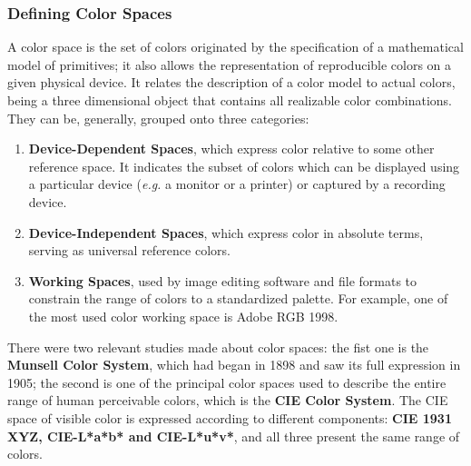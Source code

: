\subsubsection{Defining Color Spaces}			%
%
A color space is the set of colors originated by the specification of a mathematical model of primitives; it also
allows the representation of reproducible colors on a given physical device. It relates the description
of a color model to actual colors, being a three dimensional object that contains all realizable color
combinations. They can be, generally, grouped onto three categories:
%
\begin{enumerate}
	\item \textbf{Device-Dependent Spaces}, which express color relative to some other reference space. It
	  indicates the subset of colors which can be displayed using a particular device (\emph{e.g.} a monitor or a
	  printer) or captured by a recording device.
	\item \textbf{Device-Independent Spaces}, which express color in absolute terms, serving as universal
	  reference colors.
	\item \textbf{Working Spaces}, used by image editing software and file formats to constrain the range of
  	colors to a standardized palette. For example, one of the most used color working space is Adobe RGB 1998.
\end{enumerate} \par
%
There were two relevant studies made about color spaces: the fist one is the \textbf{Munsell Color System},
which had began in 1898 and saw its full expression in 1905; the second is one of the principal color spaces used to describe the
entire range of human perceivable colors, which is the \textbf{CIE Color System}. The CIE space of visible color is expressed
according to different components: \textbf{CIE 1931 XYZ, CIE-L*a*b* and CIE-L*u*v*}, and all three present the same range of colors.
%
